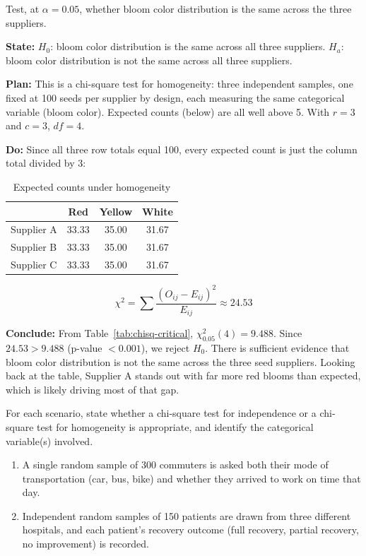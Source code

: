 Test, at $\alpha = 0.05$, whether bloom color distribution is the same across the three suppliers.

\textbf{State:} $H_0$: bloom color distribution is the same across all three suppliers. $H_a$: bloom color distribution is not the same across all three suppliers.

\textbf{Plan:} This is a chi-square test for homogeneity: three independent samples, one fixed at 100 seeds per supplier by design, each measuring the same categorical variable (bloom color). Expected counts (below) are all well above 5. With $r = 3$ and $c = 3$, $df = 4$.

\textbf{Do:} Since all three row totals equal 100, every expected count is just the column total divided by 3:

\begin{table}[H]
\centering
\caption{Expected counts under homogeneity}
\begin{tabular}{l|ccc}
 & Red & Yellow & White \\
\hline
Supplier A & 33.33 & 35.00 & 31.67 \\
Supplier B & 33.33 & 35.00 & 31.67 \\
Supplier C & 33.33 & 35.00 & 31.67 \\
\end{tabular}
\end{table}

\[
\chi^2 = \sum \frac{(O_{ij}-E_{ij})^2}{E_{ij}} \approx 24.53
\]

\textbf{Conclude:} From Table~\ref{tab:chisq-critical}, $\chi^2_{0.05}(4) = 9.488$. Since $24.53 > 9.488$ (p-value $< 0.001$), we reject $H_0$. There is sufficient evidence that bloom color distribution is not the same across the three seed suppliers. Looking back at the table, Supplier A stands out with far more red blooms than expected, which is likely driving most of that gap.

\begin{Exercise}[title={Independence or homogeneity?}, label={ex:chisq-indep-vs-homog}]
For each scenario, state whether a chi-square test for independence or a chi-square test for homogeneity is appropriate, and identify the categorical variable(s) involved.

\begin{enumerate}
    \item A single random sample of 300 commuters is asked both their mode of transportation (car, bus, bike) and whether they arrived to work on time that day.
    \item Independent random samples of 150 patients are drawn from three different hospitals, and each patient's recovery outcome (full recovery, partial recovery, no improvement) is recorded.
\end{enumerate}
\end{Exercise}

